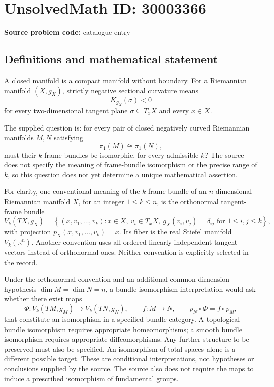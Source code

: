 \documentclass[11pt]{article}
\newcommand{\R}{\mathbb{R}}
\begin{document}
\section*{UnsolvedMath ID: 30003366}
\textbf{Source problem code:} catalogue entry
\subsection{Definitions and mathematical statement}
A closed manifold is a compact manifold without boundary. For a Riemannian manifold \((X,g_X)\), strictly negative sectional curvature means
\[
K_{g_X}(\sigma)<0
\]
for every two-dimensional tangent plane \(\sigma\subseteq T_xX\) and every \(x\in X\).

The supplied question is: for every pair of closed negatively curved Riemannian manifolds \(M,N\) satisfying
\[
\pi_1(M)\cong\pi_1(N),
\]
must their \(k\)-frame bundles be isomorphic, for every admissible \(k\)? The source does not specify the meaning of frame-bundle isomorphism or the precise range of \(k\), so this question does not yet determine a unique mathematical assertion.

For clarity, one conventional meaning of the \(k\)-frame bundle of an \(n\)-dimensional Riemannian manifold \(X\), for an integer \(1\leq k\leq n\), is the orthonormal tangent-frame bundle
\[
V_k(TX,g_X)
=
\left\{(x,v_1,\ldots,v_k):
 x\in X,\ v_i\in T_xX,\
 g_X(v_i,v_j)=\delta_{ij}\text{ for }1\leq i,j\leq k
\right\},
\]
with projection \(p_X(x,v_1,\ldots,v_k)=x\). Its fiber is the real Stiefel manifold \(V_k(\R^n)\). Another convention uses all ordered linearly independent tangent vectors instead of orthonormal ones. Neither convention is explicitly selected in the record.

Under the orthonormal convention and an additional common-dimension hypothesis \(\dim M=\dim N=n\), a bundle-isomorphism interpretation would ask whether there exist maps
\[
\Phi:V_k(TM,g_M)\longrightarrow V_k(TN,g_N),
\qquad f:M\longrightarrow N,
\qquad p_N\circ\Phi=f\circ p_M,
\]
that constitute an isomorphism in a specified bundle category. A topological bundle isomorphism requires appropriate homeomorphisms; a smooth bundle isomorphism requires appropriate diffeomorphisms. Any further structure to be preserved must also be specified. An isomorphism of total spaces alone is a different possible target. These are conditional interpretations, not hypotheses or conclusions supplied by the source. The source also does not require the maps to induce a prescribed isomorphism of fundamental groups.
\end{document}
